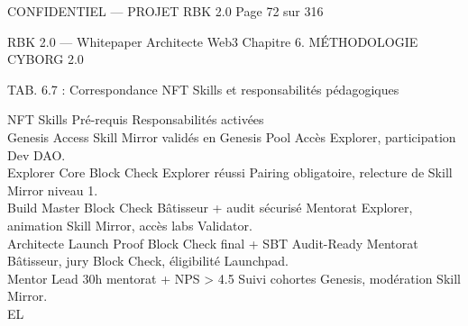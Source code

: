 \documentclass[12pt,landscape,a4paper]{article}
\newenvironment{confidential}
{\begin{tcolorbox}[
    colback=rbkred!5!white,
    colframe=rbkred!75!black,
    title=CONFIDENTIEL,
    fonttitle=\bfseries\color{white},
    coltitle=rbkred!75!black,
    breakable,
    enhanced,
    frame hidden,
    borderline west={2pt}{0pt}{rbkred!75!black}
]}
{\end{tcolorbox}}
\begin{document}
\vspace{0.5em}
\begin{confidential}CONFIDENTIEL — PROJET RBK 2.0                                            Page 72 sur 316\end{confidential}
RBK 2.0 — Whitepaper Architecte Web3                                                                                Chapitre 6. MÉTHODOLOGIE CYBORG 2.0\\
\vspace{0.5em}
\vspace{0.5em}
\begin{center}\begin{tabular}TAB. 6.7 : Correspondance NFT Skills et responsabilités pédagogiques\end{tabular}\end{center}
\vspace{0.5em}
\vspace{0.5em}
NFT Skills                   Pré-requis                                   Responsabilités activées\\
Genesis Access               Skill Mirror validés en Genesis Pool         Accès Explorer, participation Dev DAO.\\
Explorer Core                Block Check Explorer réussi                  Pairing obligatoire, relecture de Skill Mirror niveau 1.\\
Build Master                 Block Check Bâtisseur + audit sécurisé       Mentorat Explorer, animation Skill Mirror, accès labs Validator.\\
Architecte Launch Proof      Block Check final + SBT Audit-Ready          Mentorat Bâtisseur, jury Block Check, éligibilité Launchpad.\\
Mentor Lead                  30h mentorat + NPS \textgreater{} 4.5                     Suivi cohortes Genesis, modération Skill Mirror.\\
\vspace{0.5em}
\vspace{0.5em}
\vspace{0.5em}
\vspace{0.5em}
EL\\
\end{document}

